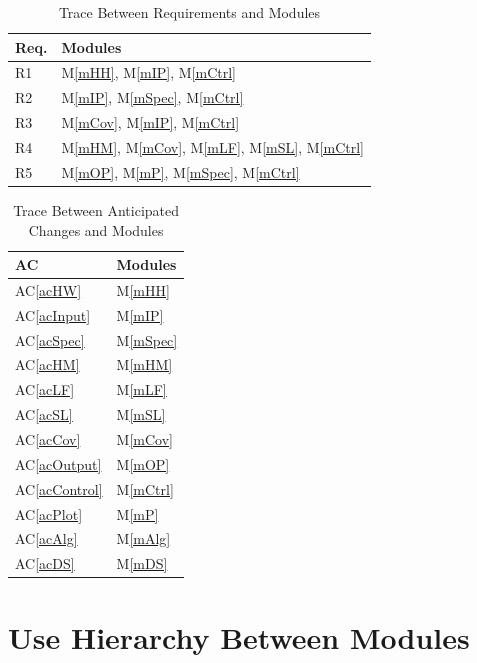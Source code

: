 \documentclass[12pt, titlepage]{article}
\newcommand{\acref}[1]{AC\ref{#1}}
\newcommand{\mref}[1]{M\ref{#1}}
\begin{document}
\begin{table}[H]
\centering
\begin{tabular}{p{} p{}}
\toprule
\textbf{Req.} & \textbf{Modules}\\
\midrule
R1 & \mref{mHH}, \mref{mIP}, \mref{mCtrl}\\
R2 & \mref{mIP}, \mref{mSpec}, \mref{mCtrl}\\
R3 & \mref{mCov}, \mref{mIP}, \mref{mCtrl}\\
R4 & \mref{mHM}, \mref{mCov}, \mref{mLF}, \mref{mSL}, \mref{mCtrl}\\
R5 & \mref{mOP}, \mref{mP}, \mref{mSpec}, \mref{mCtrl}\\

\bottomrule
\end{tabular}
\caption{Trace Between Requirements and Modules}
\label{TblRT}
\end{table}

\begin{table}[H]
\centering
\begin{tabular}{p{} p{}}
\toprule
\textbf{AC} & \textbf{Modules}\\
\midrule
\acref{acHW} & \mref{mHH}\\
\acref{acInput} & \mref{mIP}\\
\acref{acSpec} & \mref{mSpec}\\
\acref{acHM} & \mref{mHM}\\
\acref{acLF} & \mref{mLF}\\
\acref{acSL} & \mref{mSL}\\
\acref{acCov} & \mref{mCov}\\
\acref{acOutput} & \mref{mOP}\\
\acref{acControl} & \mref{mCtrl}\\
\acref{acPlot} & \mref{mP}\\
\acref{acAlg} & \mref{mAlg}\\
\acref{acDS} & \mref{mDS}\\

\bottomrule
\end{tabular}
\caption{Trace Between Anticipated Changes and Modules}
\label{TblACT}
\end{table}

\section{Use Hierarchy Between Modules} \label{SecUse}
\end{document}
